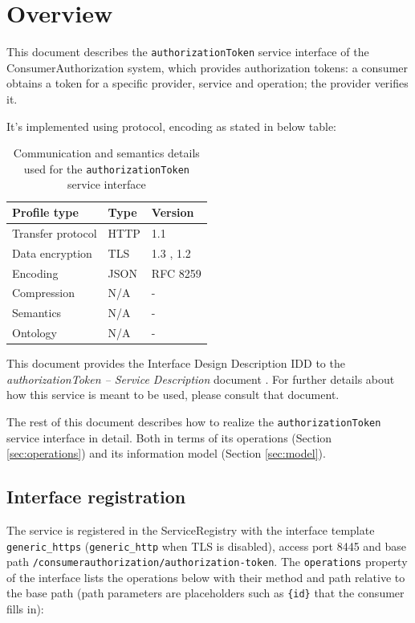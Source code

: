 \documentclass[a4paper]{arrowhead}
\begin{document}
\section{Overview}
\label{sec:overview}

This document describes the \texttt{authorizationToken} service interface of the ConsumerAuthorization system, which provides authorization tokens: a consumer obtains a token for a specific provider, service and operation; the provider verifies it.

It's implemented using protocol, encoding as stated in below table:
\begin{table}[ht!]
  \centering
  \begin{tabular}{|l|l|l|}
    \hline
    \rowcolor{gray!33} Profile type & Type & Version \\ \hline
    Transfer protocol & HTTP & 1.1 \cite{rfc9112} \\ \hline
    Data encryption & TLS & 1.3 \cite{rfc8446}, 1.2 \cite{rfc5246} \\ \hline
    Encoding & JSON & RFC 8259 \cite{rfc8259} \\ \hline
    Compression & N/A & - \\ \hline
    Semantics & N/A & - \\ \hline
    Ontology & N/A & - \\ \hline
  \end{tabular}
  \caption{Communication and semantics details used for the \texttt{authorizationToken} service interface}
  \label{tab:comunication_semantics_profile}
\end{table}

This document provides the Interface Design Description IDD to the \textit{authorizationToken -- Service Description} document \cite{ca-authorizationToken-sd}.
For further details about how this service is meant to be used, please consult that document.

The rest of this document describes how to realize the \texttt{authorizationToken} service
interface in detail. Both in terms of its operations (Section \ref{sec:operations}) and its information model (Section \ref{sec:model}).

\subsection{Interface registration}

The service is registered in the ServiceRegistry with the interface template \texttt{generic\_\allowbreak{}https} (\texttt{generic\_\allowbreak{}http} when TLS is disabled), access port 8445 and base path \texttt{/\allowbreak{}consumerauthorization/\allowbreak{}authorization-\allowbreak{}token}. The \texttt{operations} property of the interface lists the operations below with their method and path relative to the base path (path parameters are placeholders such as \texttt{\{id\}} that the consumer fills in):
\end{document}
